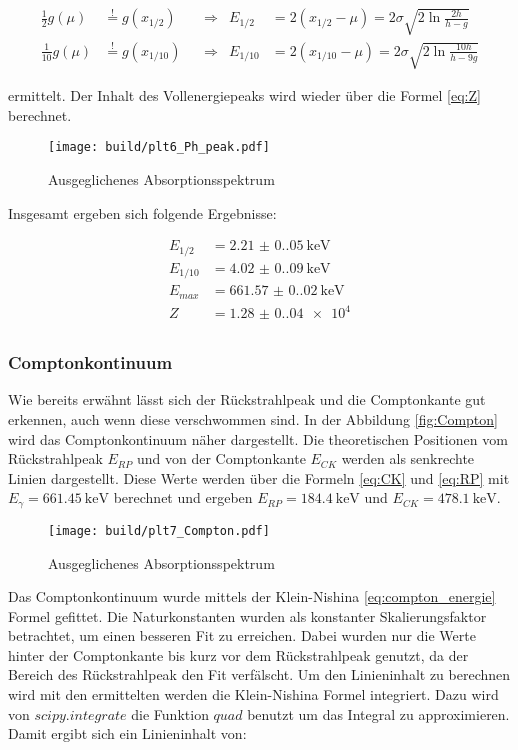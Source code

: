 \begin{align*}
	\frac{1}{2}g(\mu)  & \stackrel{!}{=}g(x_{1/2})  &  & \Rightarrow & E_{1/2}  & =2(x_{1/2}-\mu)=2\sigma \sqrt{2 \ln{\frac{2h}{h-g}}}    \\
	\frac{1}{10}g(\mu) & \stackrel{!}{=}g(x_{1/10}) &  & \Rightarrow & E_{1/10} & =2(x_{1/10}-\mu)=2\sigma \sqrt{2 \ln{\frac{10h}{h-9g}}}
\end{align*}

ermittelt. Der Inhalt des Vollenergiepeaks wird wieder über die Formel
\eqref{eq:Z} berechnet.

\begin{figure}[H]
	\centering
	\texttt{[image: build/plt6\_Ph\_peak.pdf]}
	\caption{Ausgeglichenes Absorptionsspektrum}
	\label{fig:Cs_peak}
\end{figure}

Insgesamt ergeben sich folgende Ergebnisse:

\begin{align*}
	E_{1/2}  & =\qty{2.21(0.05)}{\kilo\eV}   \\
	E_{1/10} & =\qty{4.02(0.09)}{\kilo\eV}   \\
	E_{max}  & =\qty{661.57(0.02)}{\kilo\eV} \\
	Z        & =\num{1.28(0.04)e4}           \\
\end{align*}

\subsubsection{Comptonkontinuum}
Wie bereits erwähnt lässt sich der Rückstrahlpeak und die Comptonkante gut
erkennen, auch wenn diese verschwommen sind. In der Abbildung
\eqref{fig:Compton} wird das Comptonkontinuum näher dargestellt. Die
theoretischen Positionen vom Rückstrahlpeak $E_{RP}$ und von der Comptonkante
$E_{CK}$ werden als senkrechte Linien dargestellt. Diese Werte werden über die
Formeln \eqref{eq:CK} und \eqref{eq:RP} mit $E_{\gamma}=\qty{661.45}{\kilo\eV}$
berechnet und ergeben $E_{RP}=\qty{184.4}{\kilo\eV}$ und
$E_{CK}=\qty{478.1}{\kilo\eV}$.

\begin{figure}[H]
	\centering
	\texttt{[image: build/plt7\_Compton.pdf]}
	\caption{Ausgeglichenes Absorptionsspektrum}
	\label{fig:Compton}
\end{figure}

Das Comptonkontinuum wurde mittels der Klein-Nishina \eqref{eq:compton_energie}
Formel gefittet. Die Naturkonstanten wurden als konstanter Skalierungsfaktor
betrachtet, um einen besseren Fit zu erreichen. Dabei wurden nur die Werte
hinter der Comptonkante bis kurz vor dem Rückstrahlpeak genutzt, da der Bereich
des Rückstrahlpeak den Fit verfälscht. Um den Linieninhalt zu berechnen wird
mit den ermittelten werden die Klein-Nishina Formel integriert. Dazu wird von
$scipy.integrate$ \cite{scipy} die Funktion $quad$ benutzt um das Integral zu
approximieren. Damit ergibt sich ein Linieninhalt von:

